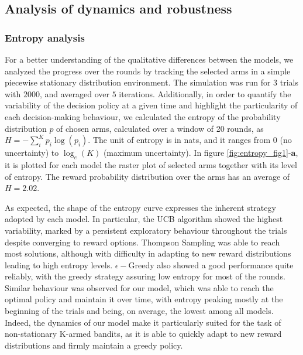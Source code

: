 \subsection{Analysis of dynamics and robustness}

\subsubsection{Entropy analysis}\label{sec:entropy}
\noindent For a better understanding of the qualitative differences between the models, we analyzed the progress over the rounds by tracking the selected arms in a simple piecewise stationary distribution environment.
The simulation was run for $3$ trials with $2000$, and averaged over $5$ iterations.
Additionally, in order to quantify the variability of the decision policy at a given time and highlight the particularity of each decision-making behaviour, we calculated the entropy of the probability distribution $p$ of chosen arms, calculated over a window of 20 rounds, as $H=-\sum^{K}_{i} p_{i}\log(p_{i})$.
The unit of entropy is in nats, and it ranges from $0$ (no uncertainty) to $\log_{e}(K)$ (maximum uncertainty).
In figure \ref{fig:entropy_fig1}-\textbf{a}, it is plotted for each model the raster plot of selected arms together with its level of entropy. The reward probability distribution over the arms has an average of $H=2.02$.

As expected, the shape of the entropy curve expresses the inherent strategy adopted by each model.
In particular, the UCB algorithm showed the highest variability, marked by a persistent exploratory behaviour throughout the trials despite converging to reward options. Thompson Sampling was able to reach most solutions, although with difficulty in adapting to new reward distributions
leading to high entropy levels.
$\epsilon-$Greedy also showed a good performance quite reliably, with the greedy strategy assuring low entropy for most of the rounds.
Similar behaviour was observed for our model, which was able to reach the optimal policy and maintain it over time, with entropy peaking mostly at the beginning of the trials and being, on average, the lowest among all models.
Indeed, the dynamics of our model make it particularly suited for the task of non-stationary K-armed bandits, as it is able to quickly adapt to new reward distributions and firmly maintain a greedy policy.

